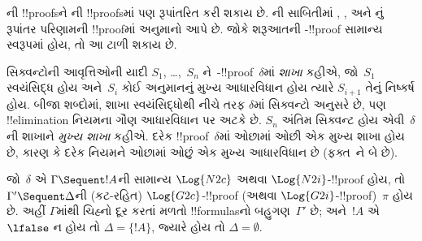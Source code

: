 \documentclass[../../../include/open-logic-section]{subfiles}
\begin{document}
ની
!!{proof}sને
ની
!!{proof}sમાં
પણ રૂપાંતરિત
કરી શકાય છે.
ની
સાબિતીમાં
\Elim{\land},
\Elim{\lif},
\Elim{\lnot} અને
\Elim{\lforall}નું
રૂપાંતર પરિણામની
!!{proof}માં
\Cut{} અનુમાનો
આપે છે.
જોકે શરૂઆતની
-!!{proof}
સામાન્ય સ્વરૂપમાં
હોય, તો આ
ટાળી શકાય છે.

સિક્વન્ટોની
આવૃત્તિઓની
યાદી
$S_1$, \dots,~$S_n$
ને~-!!{proof}~$\delta$માં
\emph{શાખા} કહીએ,
જો~$S_1$
સ્વયંસિદ્ધ હોય
અને~$S_i$
કોઈ અનુમાનનું
મુખ્ય આધારવિધાન
હોય ત્યારે
$S_{i+1}$
તેનું નિષ્કર્ષ
હોય. બીજા
શબ્દોમાં, શાખા
સ્વયંસિદ્ધોથી
નીચે તરફ
$\delta$માં
સિક્વન્ટો અનુસરે
છે, પણ
!!{elimination}
નિયમના ગૌણ
આધારવિધાન પર
અટકે છે.
$S_n$ અંતિમ
સિક્વન્ટ હોય
એવી~$\delta$ની
શાખાને
\emph{મુખ્ય શાખા}
કહીએ. દરેક
!!{proof}~$\delta$માં
ઓછામાં ઓછી
એક મુખ્ય શાખા
હોય છે, કારણ
કે દરેક નિયમને
ઓછામાં ઓછું
એક મુખ્ય
આધારવિધાન છે
(ફક્ત~\Intro{\land}ને
બે છે).


\begin{prop}
જો~$\delta$ એ
$\Gamma \Sequent !A$ની
સામાન્ય
$\Log{N2c}$ અથવા
$\Log{N2i}$-!!{proof}
હોય, તો
$\Gamma' \Sequent \Delta$ની
(કટ-રહિત)
$\Log{G2c}$-!!{proof}
(અથવા
$\Log{G2i}$-!!{proof})~$\pi$
હોય છે. અહીં
$\Gamma$માંથી
ચિહ્નો દૂર કરતાં
મળતો !!{formula}sનો
બહુગણ~$\Gamma'$
છે; અને~$!A$
એ~$\lfalse$
ન હોય તો
$\Delta = \{!A\}$,
જ્યારે હોય તો
$\Delta = \emptyset$.
\end{prop}
\end{document}
